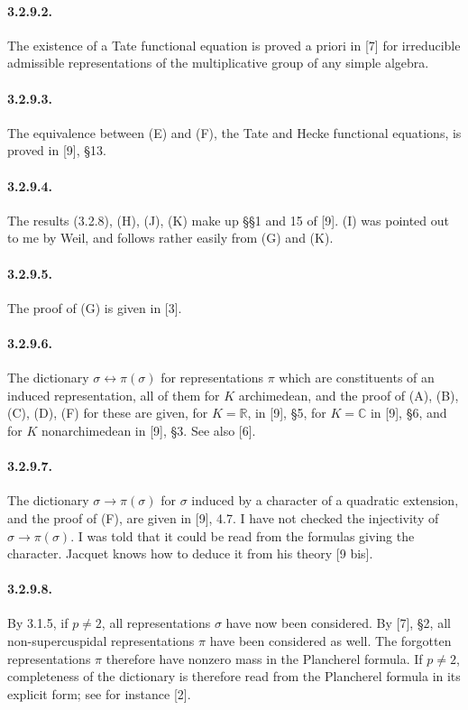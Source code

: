 \documentclass[10pt,a4paper]{article}
\providecommand{\R}{\mathbb R}
\providecommand{\C}{\mathbb C}
\begin{document}
\paragraph{3.2.9.2.} The existence of a Tate functional equation is proved a priori in [7] for irreducible admissible representations of the multiplicative group of any simple algebra.

\paragraph{3.2.9.3.} The equivalence between (E) and (F), the Tate and Hecke functional equations, is proved in [9], §13.

\paragraph{3.2.9.4.} The results (3.2.8), (H), (J), (K) make up §§1 and 15 of [9]. (I) was pointed out to me by Weil, and follows rather easily from (G) and (K).

\clearpage
{}
\hypertarget{authority-50}{}
\paragraph{3.2.9.5.} The proof of (G) is given in [3].

\paragraph{3.2.9.6.} The dictionary \(\sigma\longleftrightarrow\pi(\sigma)\) for representations \(\pi\) which are constituents of an induced representation, all of them for \(K\) archimedean, and the proof of (A), (B), (C), (D), (F) for these are given, for \(K=\R\), in [9], §5, for \(K=\C\) in [9], §6, and for \(K\) nonarchimedean in [9], §3. See also [6].

\paragraph{3.2.9.7.} The dictionary \(\sigma\longrightarrow\pi(\sigma)\) for \(\sigma\) induced by a character of a quadratic extension, and the proof of (F), are given in [9], 4.7. I have not checked the injectivity of \(\sigma\longrightarrow\pi(\sigma)\). I was told that it could be read from the formulas giving the character. Jacquet knows how to deduce it from his theory [9 bis].

\paragraph{3.2.9.8.} By 3.1.5, if \(p\ne2\), all representations \(\sigma\) have now been considered. By [7], §2, all non-supercuspidal representations \(\pi\) have been considered as well. The forgotten representations \(\pi\) therefore have nonzero mass in the Plancherel formula. If \(p\ne2\), completeness of the dictionary is therefore read from the Plancherel formula in its explicit form; see for instance [2].
\end{document}

